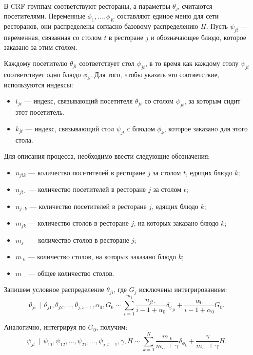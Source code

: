\documentclass[14pt,a4paper,oneside]{extarticle}
\DeclareMathOperator{\svert}{\,\vert\,}
\begin{document}
  В CRF группам соответствуют рестораны, а параметры $\theta_{ji}$ считаются посетителями. Переменные $\phi_1, \ldots, \phi_K$ составляют единое меню для сети ресторанов, они распределены согласно базовому распределению $H$. Пусть $\psi_{jt}$ --- переменная, связанная со столом $t$ в ресторане $j$ и обозначающее блюдо, которое заказано за этим столом.
  
  Каждому посетителю $\theta_{ji}$ соответствует стол $\psi_{jt}$, в то время как каждому столу $\psi_{jt}$ соответствует одно блюдо $\phi_k$. Для того, чтобы указать это соответствие, используются индексы:
  \begin{itemize}
  	\item $t_{ji}$ --- индекс, связывающий посетителя $\theta_{ji}$ со столом $\psi_{jt}$, за которым сидит этот посетитель.
  	\item $k_{jt}$ --- индекс, связывающий стол $\psi_{jt}$ с блюдом $\phi_k$, которое заказано для этого стола.
  \end{itemize}
  Для описания процесса, необходимо ввести следующие обозначения:
  \begin{itemize}
  \item $n_{jtk}$ --- количество посетителей в ресторане $j$ за столом $t$, едящих блюдо $k$;
  \item $n_{jt\cdot}$ --- количество посетителей в ресторане $j$ за столом $t$;
  \item $n_{j\cdot k}$ --- количество посетителей в ресторане $j$, едящих блюдо $k$;
  \item $m_{jk}$ --- количество столов в ресторане $j$, на которых заказано блюдо $k$;
  \item $m_{j\cdot}$ --- количество столов в ресторане $j$;
  \item $m_{\cdot k}$ --- количество столов, на которых заказано блюдо $k$;
  \item $m_{\cdot \cdot}$ --- общее количество столов.
  \end{itemize}
  
  Запишем условное распределение $\theta_{ji}$, где $G_j$ исключены интегрированием:
  \begin{equation}
  \label{eq:1}
  \theta_{ji} \svert \theta_{j1}, \theta_{j2}, \ldots, \theta_{j,i-1}, \alpha_0, G_0 \sim
  \sum \limits_{i=1}^{m_j} \frac{n_{j t \cdot}}{i - 1 + \alpha_0} \delta_{\psi_{jt}} + \frac{\alpha_0}{i - 1 + \alpha_0} G_0.
  \end{equation}
  
  Аналогично, интегрируя по $G_0$, получим:
  \begin{equation}
  \label{eq:2}
  \psi_{jt} \svert \psi_{11}, \psi_{12}, \ldots, \psi_{21}, \ldots, \psi_{j, t-1}, \gamma, H \sim
  \sum \limits_{k=1}^{K} \frac{m_{\cdot k}}{m_{\cdot \cdot} + \gamma} \delta_{\phi_k} + \frac{\gamma}{m_{\cdot \cdot} + \gamma} H.
  \end{equation}
  
\end{document}
